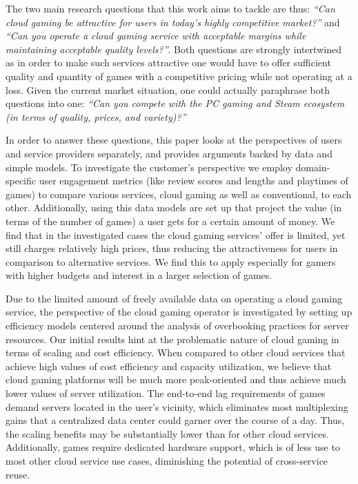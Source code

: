 The two main research questions that this work aims to tackle are thus: \textit{``Can cloud gaming be attractive for users in today's highly competitive market?''} and \textit{``Can you operate a cloud gaming service with acceptable margins while maintaining acceptable quality levels?''}. Both questions are strongly intertwined as in order to make such services attractive one would have to offer sufficient quality and quantity of games with a competitive pricing while not operating at a loss. Given the current market situation, one could actually paraphrase both questions into one: \textit{``Can you compete with the PC gaming and Steam ecosystem (in terms of quality, prices, and variety)?''}

In order to answer these questions, this paper looks at the perspectives of users and service providers separately, and provides arguments backed by data and simple models. To investigate the customer's perspective we employ domain-specific user engagement metrics (like review scores and lengths and playtimes of games) to compare various services, cloud gaming as well as conventional, to each other. Additionally, using this data models are set up that project the value (in terms of the number of games) a user gets for a certain amount of money. We find that in the investigated cases the cloud gaming services' offer is limited, yet still charges relatively high prices, thus reducing the attractiveness for users in comparison to alternative services. We find this to apply especially for gamers with higher budgets and interest in a larger selection of games.

Due to the limited amount of freely available data on operating a cloud gaming service, the perspective of the cloud gaming operator is investigated by setting up efficiency models centered around the analysis of overbooking practices for server resources. Our initial results hint at the problematic nature of cloud gaming in terms of scaling and cost efficiency. When compared to other cloud services that achieve high values of cost efficiency and capacity utilization, we believe that cloud gaming platforms will be much more peak-oriented and thus achieve much lower values of server utilization. The end-to-end lag requirements of games demand servers located in the user's vicinity, which eliminates most multiplexing gains that a centralized data center could garner over the course of a day. Thus, the scaling benefits may be substantially lower than for other cloud services. Additionally, games require dedicated hardware support, which is of less use to most other cloud service use cases, diminishing the potential of cross-service reuse.

